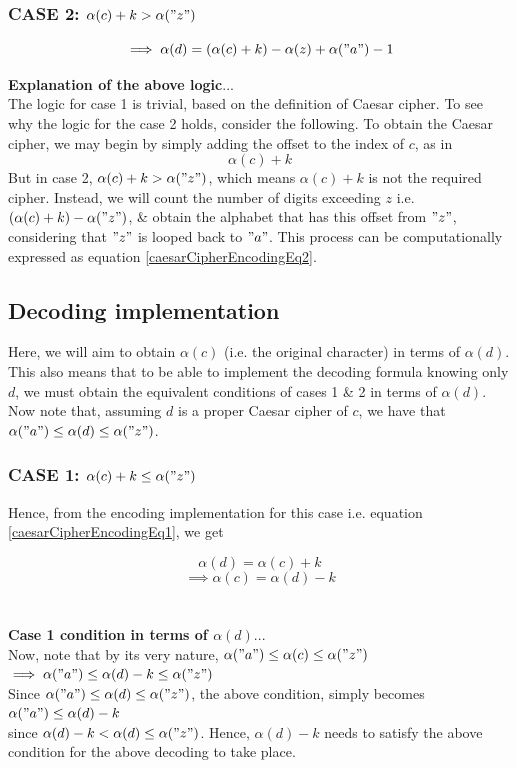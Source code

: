\subsubsection{CASE 2: $\alpha(c)+k > \alpha("z")$}
\begin{equation} \label{caesarCipherEncodingEq2} \implies \alpha(d) = (\alpha(c)+k) - \alpha(z) + \alpha("a") - 1 \end{equation}

\textbf{Explanation of the above logic}...\\
The logic for case 1 is trivial, based on the definition of Caesar cipher. To see why the logic for the case 2 holds, consider the following. To obtain the Caesar cipher, we may begin by simply adding the offset to the index of $c$, as in
\[\alpha(c)+k\]
But in case 2, $\alpha(c)+k > \alpha("z")$, which means $\alpha(c)+k$ is not the required cipher. Instead, we will count the number of digits exceeding $z$ i.e. $(\alpha(c)+k)-\alpha("z")$, \& obtain the alphabet that has this offset from $"z"$, considering that $"z"$ is looped back to $"a"$. This process can be computationally expressed as equation \ref{caesarCipherEncodingEq2}.



\subsection{Decoding implementation}
Here, we will aim to obtain $\alpha(c)$ (i.e. the original character) in terms of $\alpha(d)$. This also means that to be able to implement the decoding formula knowing only $d$, we must obtain the equivalent conditions of cases 1 \& 2 in terms of $\alpha(d)$. Now note that, assuming $d$ is a proper Caesar cipher of $c$, we have that $\alpha("a") \leq \alpha(d) \leq \alpha("z")$.
\subsubsection{CASE 1: $\alpha(c)+k \leq \alpha("z")$}
Hence, from the encoding implementation for this case i.e. equation \ref{caesarCipherEncodingEq1}, we get

\[\alpha(d) = \alpha(c)+k\]
\begin{equation} \label{caesarCipherDecodingEq1} \implies \alpha(c) = \alpha(d) - k \end{equation}
\\~\\
\textbf{Case 1 condition in terms of $\alpha(d)$}...\\
Now, note that by its very nature, $\alpha("a") \leq \alpha(c) \leq \alpha("z")$\\
$\implies \alpha("a") \leq \alpha(d) - k  \leq \alpha("z")$\\
Since $\alpha("a") \leq \alpha(d) \leq \alpha("z")$, the above condition, simply becomes\\
$\alpha("a") \leq \alpha(d) - k$\\
since $\alpha(d) - k < \alpha(d) \leq \alpha("z")$. Hence, $\alpha(d) - k$ needs to satisfy the above condition for the above decoding to take place.


